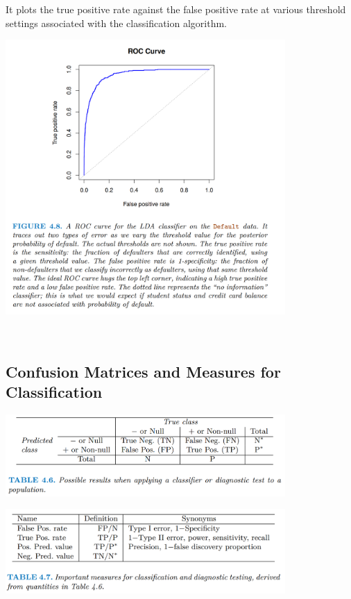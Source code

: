 \documentclass[11pt]{article}
\begin{document}
\noindent It plots the true positive rate against the false positive rate at various threshold settings associated with the classification algorithm.
\begin{center}
  \includegraphics[width=0.8\textwidth]{LDA Example ROC Curve.png}
\end{center}
\phantom{i}\\

\subsection{Confusion Matrices and Measures for Classification}

\begin{center}
  \includegraphics[width=0.8\textwidth]{Classificaiton Confusion Matrix Definition.png}
\end{center}

\begin{center}
  \includegraphics[width=0.8\textwidth]{Measures of Classification.png}
\end{center}
\end{document}
